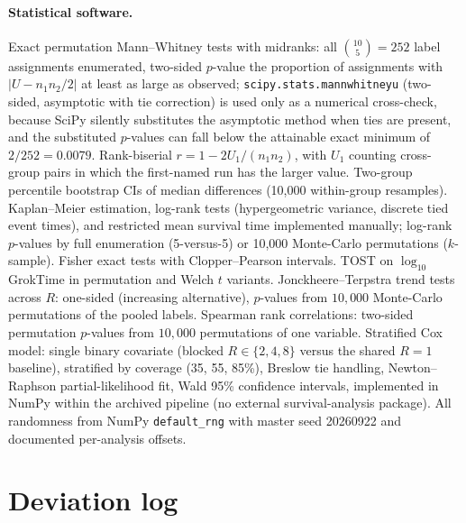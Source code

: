 \documentclass[10pt]{article}
\newcommand{\groktime}{GrokTime}
\begin{document}
\paragraph{Statistical software.}
Exact permutation Mann--Whitney tests with midranks: all $\binom{10}{5}=252$ label assignments enumerated, two-sided $p$-value the proportion of assignments with $|U - n_1 n_2/2|$ at least as large as observed; \texttt{scipy.stats.mannwhitneyu} (two-sided, asymptotic with tie correction) is used only as a numerical cross-check, because SciPy silently substitutes the asymptotic method when ties are present, and the substituted $p$-values can fall below the attainable exact minimum of $2/252 = 0.0079$. Rank-biserial $r = 1 - 2U_1/(n_1 n_2)$, with $U_1$ counting cross-group pairs in which the first-named run has the larger value. Two-group percentile bootstrap CIs of median differences (10{,}000 within-group resamples). Kaplan--Meier estimation, log-rank tests (hypergeometric variance, discrete tied event times), and restricted mean survival time implemented manually; log-rank $p$-values by full enumeration (5-versus-5) or 10{,}000 Monte-Carlo permutations ($k$-sample). Fisher exact tests with Clopper--Pearson intervals. TOST on $\log_{10}$ \groktime{} in permutation and Welch $t$ variants. Jonckheere--Terpstra trend tests across $R$: one-sided (increasing alternative), $p$-values from $10{,}000$ Monte-Carlo permutations of the pooled labels. Spearman rank correlations: two-sided permutation $p$-values from $10{,}000$ permutations of one variable. Stratified Cox model: single binary covariate (blocked $R \in \{2,4,8\}$ versus the shared $R=1$ baseline), stratified by coverage (35, 55, 85\%), Breslow tie handling, Newton--Raphson partial-likelihood fit, Wald 95\% confidence intervals, implemented in NumPy within the archived pipeline (no external survival-analysis package). All randomness from NumPy \texttt{default\_rng} with master seed 20260922 and documented per-analysis offsets.

\section{Deviation log}
\label{app:deviations}
\end{document}
